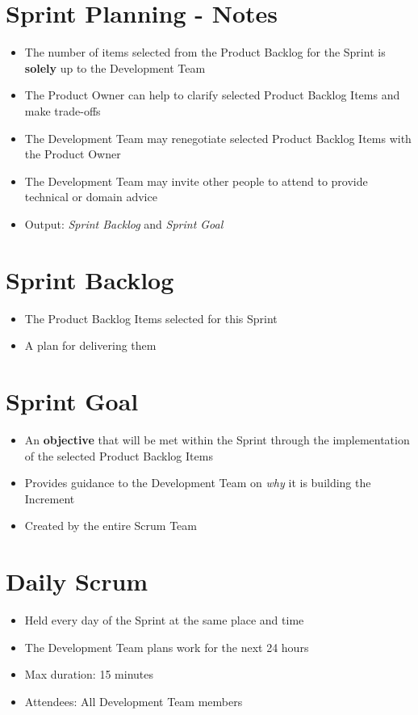 \documentclass[a4paper,11pt,twocolumn]{article}
\begin{document}
\section*{Sprint Planning - Notes}
\begin{itemize}
    \item The number of items selected from the Product Backlog for the Sprint is \textbf{solely} up to the Development Team
	\item The Product Owner can help to clarify selected Product Backlog Items and make trade-offs
	\item The Development Team may renegotiate selected Product Backlog Items with the Product Owner
	\item The Development Team may invite other people to attend to provide technical or domain advice
	\item Output: \textit{Sprint Backlog} and \textit{Sprint Goal}
\end{itemize}

\section*{Sprint Backlog}
\begin{itemize}
    \item The Product Backlog Items selected for this Sprint
    \item A plan for delivering them
\end{itemize}

\section*{Sprint Goal}
\begin{itemize}
    \item An \textbf{objective} that will be met within the Sprint through the implementation of the selected Product Backlog Items
    \item Provides guidance to the Development Team on \textit{why} it is building the Increment
    \item Created by the entire Scrum Team
\end{itemize}

\section*{Daily Scrum}
\begin{itemize}
    \item Held every day of the Sprint at the same place and time
    \item The Development Team plans work for the next 24 hours
	\item Max duration: 15 minutes
	\item Attendees: All Development Team members
\end{itemize}
\end{document}
